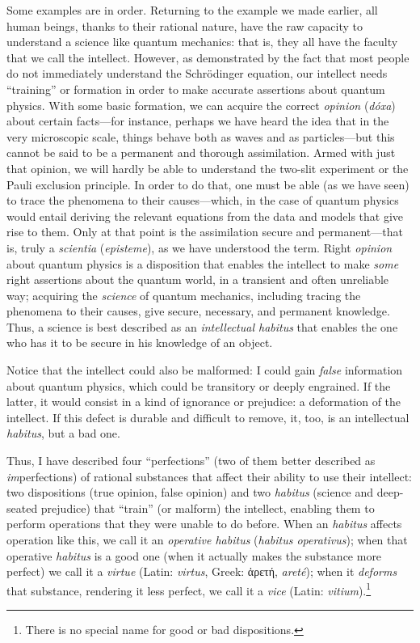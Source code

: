\documentclass[
  12pt,
]{memoir}
\begin{document}
Some examples are in order. Returning to the example we made earlier,
all human beings, thanks to their rational nature, have the raw capacity
to understand a science like quantum mechanics: that is, they all have
the faculty that we call the intellect. However, as demonstrated by the
fact that most people do not immediately understand the Schrödinger
equation, our intellect needs ``training'' or formation in order to make
accurate assertions about quantum physics. With some basic formation, we
can acquire the correct \emph{opinion} (\emph{dóxa}) about certain
facts---for instance, perhaps we have heard the idea that in the very
microscopic scale, things behave both as waves and as particles---but
this cannot be said to be a permanent and thorough assimilation. Armed
with just that opinion, we will hardly be able to understand the
two-slit experiment or the Pauli exclusion principle. In order to do
that, one must be able (as we have seen) to trace the phenomena to their
causes---which, in the case of quantum physics would entail deriving the
relevant equations from the data and models that give rise to them. Only
at that point is the assimilation secure and permanent---that is, truly
a \emph{scientia} (\emph{episteme}), as we have understood the term.
Right \emph{opinion} about quantum physics is a disposition that enables
the intellect to make \emph{some} right assertions about the quantum
world, in a transient and often unreliable way; acquiring the
\emph{science} of quantum mechanics, including tracing the phenomena to
their causes, give secure, necessary, and permanent knowledge. Thus, a
science is best described as an \emph{intellectual habitus} that enables
the one who has it to be secure in his knowledge of an object.

Notice that the intellect could also be malformed: I could gain
\emph{false} information about quantum physics, which could be
transitory or deeply engrained. If the latter, it would consist in a
kind of ignorance or prejudice: a deformation of the intellect. If this
defect is durable and difficult to remove, it, too, is an intellectual
\emph{habitus}, but a bad one.

Thus, I have described four ``perfections'' (two of them better
described as \emph{im}perfections) of rational substances that affect
their ability to use their intellect: two dispositions (true opinion,
false opinion) and two \emph{habitus} (science and deep-seated
prejudice) that ``train'' (or malform) the intellect, enabling them to
perform operations that they were unable to do before. When an
\emph{habitus} affects operation like this, we call it an
\emph{operative habitus} (\emph{habitus operativus}); when that
operative \emph{habitus} is a good one (when it actually makes the
substance more perfect) we call it a \emph{virtue} (Latin:
\emph{virtus}, Greek: ἀρετή, \emph{areté}); when it \emph{deforms} that
substance, rendering it less perfect, we call it a \emph{vice} (Latin:
\emph{vitium}).\footnote{There is no special name for good or bad
  dispositions.}
\end{document}
